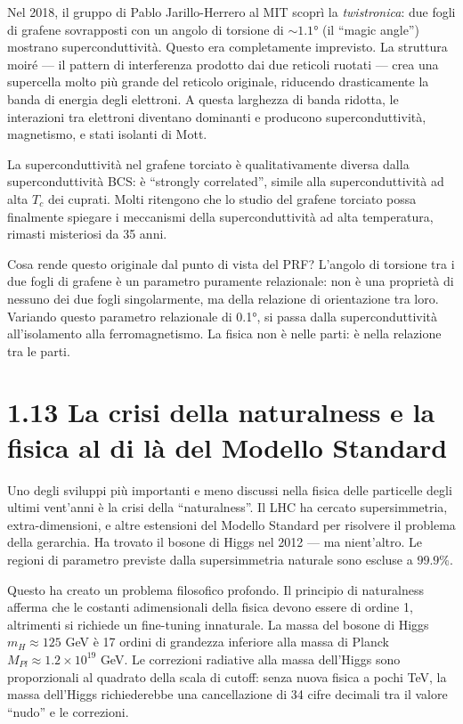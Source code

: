 \documentclass[11.5pt,a4paper,openany]{book}
\theoremstyle{remark}
\begin{document}
Nel 2018, il gruppo di Pablo Jarillo-Herrero al MIT scoprì la \textit{twistronica}: due fogli di grafene sovrapposti con un angolo di torsione di $\sim 1.1°$ (il ``magic angle'') mostrano superconduttività. Questo era completamente imprevisto. La struttura moiré --- il pattern di interferenza prodotto dai due reticoli ruotati --- crea una supercella molto più grande del reticolo originale, riducendo drasticamente la banda di energia degli elettroni. A questa larghezza di banda ridotta, le interazioni tra elettroni diventano dominanti e producono superconduttività, magnetismo, e stati isolanti di Mott.

La superconduttività nel grafene torciato è qualitativamente diversa dalla superconduttività BCS: è ``strongly correlated'', simile alla superconduttività ad alta $T_c$ dei cuprati. Molti ritengono che lo studio del grafene torciato possa finalmente spiegare i meccanismi della superconduttività ad alta temperatura, rimasti misteriosi da 35 anni.

Cosa rende questo originale dal punto di vista del PRF? L'angolo di torsione tra i due fogli di grafene è un parametro puramente relazionale: non è una proprietà di nessuno dei due fogli singolarmente, ma della relazione di orientazione tra loro. Variando questo parametro relazionale di 0.1°, si passa dalla superconduttività all'isolamento alla ferromagnetismo. La fisica non è nelle parti: è nella relazione tra le parti.

\section{1.13 La crisi della naturalness e la fisica al di là del Modello Standard}

Uno degli sviluppi più importanti e meno discussi nella fisica delle particelle degli ultimi vent'anni è la crisi della ``naturalness''. Il LHC ha cercato supersimmetria, extra-dimensioni, e altre estensioni del Modello Standard per risolvere il problema della gerarchia. Ha trovato il bosone di Higgs nel 2012 --- ma nient'altro. Le regioni di parametro previste dalla supersimmetria naturale sono escluse a $99.9\%$.

Questo ha creato un problema filosofico profondo. Il principio di naturalness afferma che le costanti adimensionali della fisica devono essere di ordine 1, altrimenti si richiede un fine-tuning innaturale. La massa del bosone di Higgs $m_H \approx 125$ GeV è 17 ordini di grandezza inferiore alla massa di Planck $M_{Pl} \approx 1.2 \times 10^{19}$ GeV. Le correzioni radiative alla massa dell'Higgs sono proporzionali al quadrato della scala di cutoff: senza nuova fisica a pochi TeV, la massa dell'Higgs richiederebbe una cancellazione di 34 cifre decimali tra il valore ``nudo'' e le correzioni.
\end{document}
